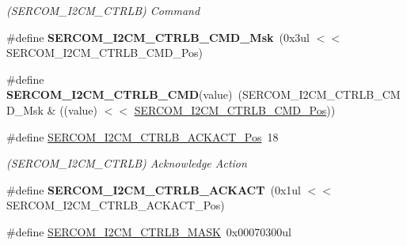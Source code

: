 \begin{DoxyCompactItemize}
\begin{DoxyCompactList}\small\item\em (S\+E\+R\+C\+O\+M\+\_\+\+I2\+C\+M\+\_\+\+C\+T\+R\+L\+B) Command \end{DoxyCompactList}\item 
\hypertarget{group___s_a_m_l21___s_e_r_c_o_m_gaecec29149557ec7136e2d462e85e1b98}{}\#define {\bfseries S\+E\+R\+C\+O\+M\+\_\+\+I2\+C\+M\+\_\+\+C\+T\+R\+L\+B\+\_\+\+C\+M\+D\+\_\+\+Msk}~(0x3ul $<$$<$ S\+E\+R\+C\+O\+M\+\_\+\+I2\+C\+M\+\_\+\+C\+T\+R\+L\+B\+\_\+\+C\+M\+D\+\_\+\+Pos)\label{group___s_a_m_l21___s_e_r_c_o_m_gaecec29149557ec7136e2d462e85e1b98}

\item 
\hypertarget{group___s_a_m_l21___s_e_r_c_o_m_gaf73b0445a5a6f4df5d633066e645ca49}{}\#define {\bfseries S\+E\+R\+C\+O\+M\+\_\+\+I2\+C\+M\+\_\+\+C\+T\+R\+L\+B\+\_\+\+C\+M\+D}(value)~(S\+E\+R\+C\+O\+M\+\_\+\+I2\+C\+M\+\_\+\+C\+T\+R\+L\+B\+\_\+\+C\+M\+D\+\_\+\+Msk \& ((value) $<$$<$ \hyperlink{group___s_a_m_l21___s_e_r_c_o_m_gabb90fce400c668fbc6016447c98febf2}{S\+E\+R\+C\+O\+M\+\_\+\+I2\+C\+M\+\_\+\+C\+T\+R\+L\+B\+\_\+\+C\+M\+D\+\_\+\+Pos}))\label{group___s_a_m_l21___s_e_r_c_o_m_gaf73b0445a5a6f4df5d633066e645ca49}

\item 
\hypertarget{group___s_a_m_l21___s_e_r_c_o_m_gad5af71947ac228960ab1b20085276ad8}{}\#define \hyperlink{group___s_a_m_l21___s_e_r_c_o_m_gad5af71947ac228960ab1b20085276ad8}{S\+E\+R\+C\+O\+M\+\_\+\+I2\+C\+M\+\_\+\+C\+T\+R\+L\+B\+\_\+\+A\+C\+K\+A\+C\+T\+\_\+\+Pos}~18\label{group___s_a_m_l21___s_e_r_c_o_m_gad5af71947ac228960ab1b20085276ad8}

\begin{DoxyCompactList}\small\item\em (S\+E\+R\+C\+O\+M\+\_\+\+I2\+C\+M\+\_\+\+C\+T\+R\+L\+B) Acknowledge Action \end{DoxyCompactList}\item 
\hypertarget{group___s_a_m_l21___s_e_r_c_o_m_gaa6c59bd4f5003feec2ccdc33a1897695}{}\#define {\bfseries S\+E\+R\+C\+O\+M\+\_\+\+I2\+C\+M\+\_\+\+C\+T\+R\+L\+B\+\_\+\+A\+C\+K\+A\+C\+T}~(0x1ul $<$$<$ S\+E\+R\+C\+O\+M\+\_\+\+I2\+C\+M\+\_\+\+C\+T\+R\+L\+B\+\_\+\+A\+C\+K\+A\+C\+T\+\_\+\+Pos)\label{group___s_a_m_l21___s_e_r_c_o_m_gaa6c59bd4f5003feec2ccdc33a1897695}

\item 
\hypertarget{group___s_a_m_l21___s_e_r_c_o_m_gaaefd2ad280298007962bb37f2901b99e}{}\#define \hyperlink{group___s_a_m_l21___s_e_r_c_o_m_gaaefd2ad280298007962bb37f2901b99e}{S\+E\+R\+C\+O\+M\+\_\+\+I2\+C\+M\+\_\+\+C\+T\+R\+L\+B\+\_\+\+M\+A\+S\+K}~0x00070300ul\label{group___s_a_m_l21___s_e_r_c_o_m_gaaefd2ad280298007962bb37f2901b99e}


\end{DoxyCompactItemize}
